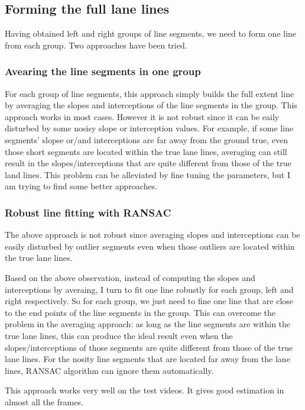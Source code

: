 \documentclass[12pt]{article}
\begin{document}
\subsection{Forming the full lane lines}
Having obtained left and right groups of line segments, we need to form one line from each group. Two approaches have been tried.

\subsubsection{Avearing the line segments in one group}
For each group of line segments, this approach simply builds the full extent line by averaging the slopes and interceptions of the line segments in the group. This approach works in most cases. However it is not robust since it can be eaily disturbed by some nosisy slope or interception values. For example, if some line segments' slopse or/and interceptions are far away from the ground true, even those short segments are located within the true lane lines, averaging can still result in the slopes/interceptions that are quite different from those of the true land lines. This problem can be alleviated by fine tuning the parameters, but I am trying to find some better approaches.

\subsubsection{Robust line fitting with RANSAC}
The above approach is not robust since averaging slopes and interceptions can be easily disturbed by outlier segments even when those outliers are located within the true lane lines.

Based on the above observation, instead of computing the slopes and interceptions by averaing, I turn to fit one line robustly for each group, left and right respectively. So for each group, we just need to fine one line that are close to the end points of the line segments in the group. This can overcome the problem in the averaging approach: as long as the line segments are within the true lane lines, this can produce the ideal result even when the slopes/interceptions of those segments are quite different from those of the true lane lines. For the nosity line segments that are located far away from the lane lines, RANSAC algorithm can ignore them automatically.

This approach works very well on the test videos. It gives good estimation in almost all the frames.
\end{document}
